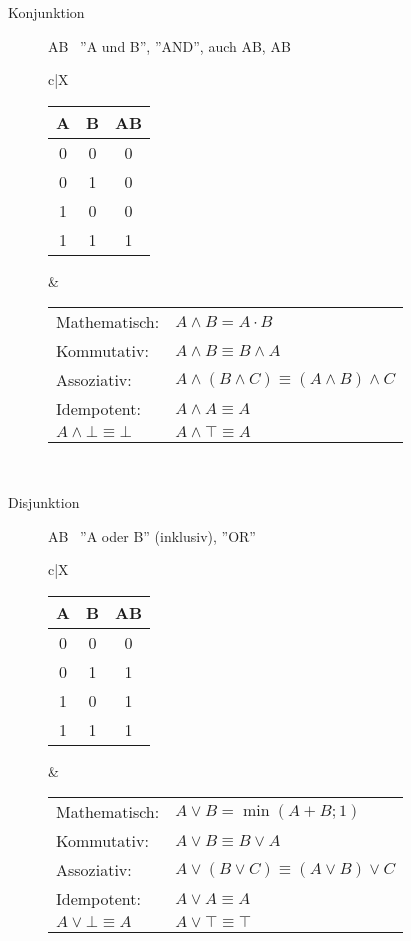\documentclass[12pt,a4paper]{article}
\begin{document}
\begin{description}
\begin{description}
			\item[Konjunktion] A\wedge B \, ''A und B'', ''AND'', auch A\cdot B, AB \\
				\begin{tabularx}{\linewidth}{c|X}
					\begin{tabular}[t]{c|c||c}
						A & B & A\wedge B \\ \hline\hline
						0 & 0 & 0 \\ \hline
						0 & 1 & 0 \\ \hline
						1 & 0 & 0 \\ \hline
						1 & 1 & 1
					\end{tabular} &
					\begin{tabular}[t]{ll}
						Mathematisch: & $A \wedge B = A \cdot B$ \\
						Kommutativ: & $A \wedge B \equiv B \wedge A$ \\
						Assoziativ: & $A \wedge (B \wedge C) \equiv (A \wedge B) \wedge C$ \\
						Idempotent: & $A \wedge A \equiv A$ \\
						$A \wedge \bot \equiv \bot$ & $A \wedge \top \equiv A$
					\end{tabular} \\ \hline
				\end{tabularx}	
			
			\item[Disjunktion] A\vee B \, ''A oder B'' (inklusiv), ''OR'' \\
				\begin{tabularx}{\linewidth}{c|X}
					\begin{tabular}[t]{c|c||c}
						A & B & A\vee B \\ \hline\hline
						0 & 0 & 0 \\ \hline
						0 & 1 & 1 \\ \hline
						1 & 0 & 1 \\ \hline
					1 & 1 & 1
					\end{tabular} &
					\begin{tabular}[t]{ll}
						Mathematisch: & $A \vee B = \min(A+B;1)$ \\
						Kommutativ: & $A \vee B \equiv B \vee A$ \\
						Assoziativ: & $A \vee (B \vee C) \equiv (A \vee B) \vee C$ \\
						Idempotent: & $A \vee A \equiv A$ \\
						$A \vee \bot \equiv A $ & $A \vee \top \equiv \top$
					\end{tabular} \\ \hline
				\end{tabularx}
				

\end{description}
\end{description}
\end{document}
